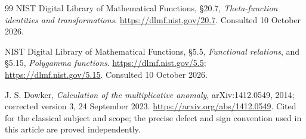 \documentclass[11pt,letterpaper]{article}
\numberwithin{equation}{section}
\theoremstyle{definition}
\begin{document}
\begin{thebibliography}{99}
NIST Digital Library of Mathematical Functions, \S20.7,
\emph{Theta-function identities and transformations}.
\url{https://dlmf.nist.gov/20.7}. Consulted 10 October 2026.

NIST Digital Library of Mathematical Functions, \S5.5,
\emph{Functional relations}, and \S5.15, \emph{Polygamma functions}.
\url{https://dlmf.nist.gov/5.5}; \url{https://dlmf.nist.gov/5.15}.
Consulted 10 October 2026.

J. S. Dowker, \emph{Calculation of the multiplicative anomaly},
arXiv:1412.0549, 2014; corrected version 3, 24 September 2023.
\url{https://arxiv.org/abs/1412.0549}.
Cited for the classical subject and scope; the precise defect and sign
convention used in this article are proved independently.
\end{thebibliography}

\end{document}
